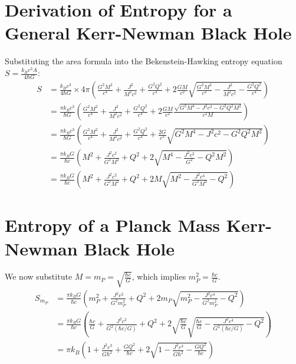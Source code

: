 	\section{Derivation of Entropy for a General Kerr-Newman Black Hole}
	
	Substituting the area formula into the Bekenstein-Hawking entropy equation $S = \frac{k_B c^3 A}{4 \hbar G}$:
	\begin{align*}
		S &= \frac{k_B c^3}{4 \hbar G} \times 4 \pi \left( \frac{G^2 M^2}{c^4} + \frac{J^2}{M^2 c^2} + \frac{G^2 Q^2}{c^4} + 2 \frac{G M}{c^2} \sqrt{\frac{G^2 M^2}{c^4} - \frac{J^2}{M^2 c^2} - \frac{G^2 Q^2}{c^4}} \right) \\
		&= \frac{\pi k_B c^3}{\hbar G} \left( \frac{G^2 M^2}{c^4} + \frac{J^2}{M^2 c^2} + \frac{G^2 Q^2}{c^4} + 2 \frac{G M}{c^2} \frac{\sqrt{G^2 M^4 - J^2 c^2 - G^2 Q^2 M^2}}{c^2 M} \right) \\
		&= \frac{\pi k_B c^3}{\hbar G} \left( \frac{G^2 M^2}{c^4} + \frac{J^2}{M^2 c^2} + \frac{G^2 Q^2}{c^4} + \frac{2 G}{c^3} \sqrt{G^2 M^4 - J^2 c^2 - G^2 Q^2 M^2} \right) \\
		&= \frac{\pi k_B G}{\hbar c} \left( M^2 + \frac{J^2 c^2}{G^2 M^2} + Q^2 + 2 \sqrt{M^4 - \frac{J^2 c^2}{G^2} - Q^2 M^2} \right) \\
		&= \frac{\pi k_B G}{\hbar c} \left( M^2 + \frac{J^2 c^2}{G^2 M^2} + Q^2 + 2 M \sqrt{M^2 - \frac{J^2 c^4}{G^2 M^2} - Q^2} \right)
	\end{align*}
	
	\section{Entropy of a Planck Mass Kerr-Newman Black Hole}
	
	We now substitute $M = m_P = \sqrt{\frac{\hbar c}{G}}$, which implies $m_P^2 = \frac{\hbar c}{G}$.
	\begin{align*}
		S_{m_P} &= \frac{\pi k_B G}{\hbar c} \left( m_P^2 + \frac{J^2 c^2}{G^2 m_P^2} + Q^2 + 2 m_P \sqrt{m_P^2 - \frac{J^2 c^4}{G^2 m_P^2} - Q^2} \right) \\
		&= \frac{\pi k_B G}{\hbar c} \left( \frac{\hbar c}{G} + \frac{J^2 c^2}{G^2 (\hbar c / G)} + Q^2 + 2 \sqrt{\frac{\hbar c}{G}} \sqrt{\frac{\hbar c}{G} - \frac{J^2 c^4}{G^2 (\hbar c / G)} - Q^2} \right) \\
		&= \pi k_B \left( 1 + \frac{J^2 c^3}{G \hbar^2} + \frac{G Q^2}{\hbar c} + 2 \sqrt{1 - \frac{J^2 c^3}{G \hbar^2} - \frac{G Q^2}{\hbar c}} \right)
	\end{align*}
	
